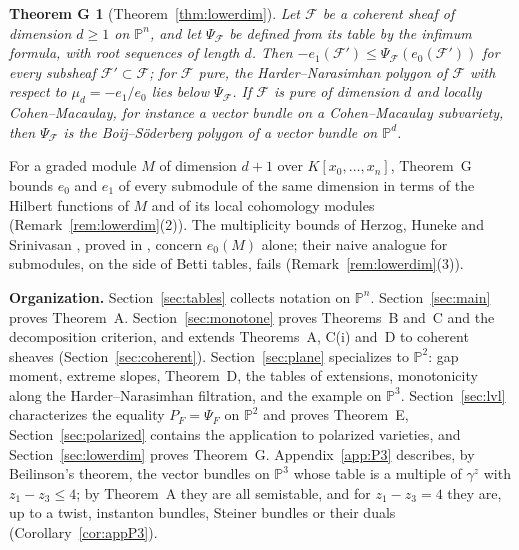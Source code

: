 \documentclass[11pt]{amsart}
\newtheorem*{theoremG}{Theorem G}
\theoremstyle{definition}
\theoremstyle{remark}
\newcommand{\PP}{\mathbb{P}}
\newcommand{\cF}{\mathcal{F}}
\begin{document}
\begin{theoremG}[Theorem~\ref{thm:lowerdim}]
Let $\cF$ be a coherent sheaf of dimension $d\ge1$ on $\PP^n$, and let $\Psi_\cF$ be defined from its table by the infimum formula, with root sequences of length $d$. Then $-e_1(\cF')\le\Psi_\cF(e_0(\cF'))$ for every subsheaf $\cF'\subset\cF$; for $\cF$ pure, the Harder--Narasimhan polygon of $\cF$ with respect to $\mu_d=-e_1/e_0$ lies below $\Psi_\cF$. If $\cF$ is pure of dimension $d$ and locally Cohen--Macaulay, for instance a vector bundle on a Cohen--Macaulay subvariety, then $\Psi_\cF$ is the Boij--Söderberg polygon of a vector bundle on $\PP^d$.
\end{theoremG}

For a graded module $M$ of dimension $d+1$ over $K[x_0,\dots,x_n]$, Theorem~G bounds $e_0$ and $e_1$ of every submodule of the same dimension in terms of the Hilbert functions of $M$ and of its local cohomology modules (Remark~\ref{rem:lowerdim}(2)). The multiplicity bounds of Herzog, Huneke and Srinivasan \cite{HS98}, proved in \cite{ES09,BS12}, concern $e_0(M)$ alone; their naive analogue for submodules, on the side of Betti tables, fails (Remark~\ref{rem:lowerdim}(3)).

\medskip\noindent\textbf{Organization.}
Section~\ref{sec:tables} collects notation on $\PP^n$. Section~\ref{sec:main} proves Theorem~A. Section~\ref{sec:monotone} proves Theorems~B and~C and the decomposition criterion, and extends Theorems~A, C(i) and~D to coherent sheaves (Section~\ref{sec:coherent}). Section~\ref{sec:plane} specializes to $\PP^2$: gap moment, extreme slopes, Theorem~D, the tables of extensions, monotonicity along the Harder--Narasimhan filtration, and the example on $\PP^3$. Section~\ref{sec:lvl} characterizes the equality $P_F=\Psi_F$ on $\PP^2$ and proves Theorem~E, Section~\ref{sec:polarized} contains the application to polarized varieties, and Section~\ref{sec:lowerdim} proves Theorem~G. Appendix~\ref{app:P3} describes, by Beilinson's theorem, the vector bundles on $\PP^3$ whose table is a multiple of $\gamma^z$ with $z_1-z_3\le4$; by Theorem~A they are all semistable, and for $z_1-z_3=4$ they are, up to a twist, instanton bundles, Steiner bundles or their duals (Corollary~\ref{cor:appP3}).
\end{document}
